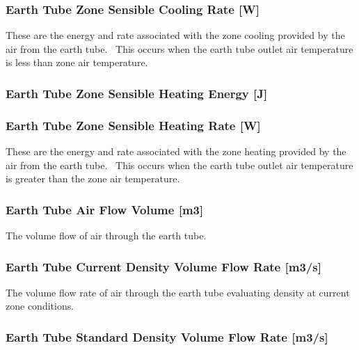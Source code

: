 \subsubsection{Earth Tube Zone Sensible Cooling Rate {[}W{]}}\label{earth-tube-zone-sensible-cooling-rate-w}

These are the energy and rate associated with the zone cooling provided by the air from the earth tube.~ This occurs when the earth tube outlet air temperature is less than zone air temperature.

\subsubsection{Earth Tube Zone Sensible Heating Energy {[}J{]}}\label{earth-tube-zone-sensible-heating-energy-j}

\subsubsection{Earth Tube Zone Sensible Heating Rate {[}W{]}}\label{earth-tube-zone-sensible-heating-rate-w}

These are the energy and rate associated with the zone heating provided by the air from the earth tube.~ This occurs when the earth tube outlet air temperature is greater than the zone air temperature.

\subsubsection{Earth Tube Air Flow Volume {[}m3{]}}\label{earth-tube-air-flow-volume-m3}

The volume flow of air through the earth tube.

\subsubsection{Earth Tube Current Density Volume Flow Rate {[}m3/s{]}}\label{earth-tube-air-current-density-volumetric-flow-rate-m3s}

The volume flow rate of air through the earth tube evaluating density at current zone conditions.

\subsubsection{Earth Tube Standard Density Volume Flow Rate {[}m3/s{]}}\label{earth-tube-air-standard-density-volumetric-flow-rate-m3s}

